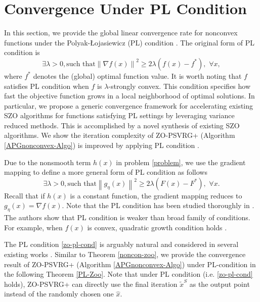 \documentclass{article}
\newcommand{\norm}[1]{\left\lVert#1\right\rVert}
\theoremstyle{definition}
\theoremstyle{remark}
\begin{document}
\section{Convergence Under PL Condition}
{\color{Violet} In this section, we provide the global linear convergence rate for nonconvex functions under the Polyak-Łojasiewicz
(PL) condition \cite{polyak1963gradient}.}
The original form of PL condition is
\begin{equation}
\exists \lambda >0, \text{such~that} \norm{\nabla f(x)}^2 \geq 2\lambda (f(x) - f^*),\,\, \forall x,
\end{equation}
where $f^*$ denotes the (global) optimal function value. It is worth noting that $f$ satisfies PL condition when $f$ is $\lambda$-strongly convex.
{\color{RubineRed}
This condition specifies how fast the objective function grows in a local neighborhood of optimal solutions.
}
{\color{RubineRed}
In particular, we propose a generic convergence framework for accelerating existing SZO algorithms for functions satisfying PL settings by leveraging variance reduced methods. This
is accomplished by a novel synthesis of existing SZO algorithms.
}{\color{Brown} We show the iteration complexity of ZO-PSVRG+ (Algorithm \ref{APGnonconvex-Algo}) is improved by applying PL condition .}



Due to the nonsmooth term $h(x)$ in problem \eqref{problem}, we use the gradient mapping to define a more general form of PL condition as follows
\begin{equation}\label{zo-pl-cond}
\exists \lambda >0, \text{such~that} \norm{g_{\eta}(x)}^2 \geq 2\lambda (F(x) - F^*),\,\, \forall x.
\end{equation}
Recall that if $h(x)$ is a constant function, the gradient mapping reduces to $g_{\eta}(x) = \nabla f(x)$.
{\color{RubineRed}
Note that the PL condition has been studied thoroughly in \cite{karimi2016linear}. The authors show that PL condition is weaker than broad family of  conditions. For example, when $f(x)$ is convex,  quadratic growth condition holds \cite{luo1993error,anitescu2000degenerate}. 
}

The PL condition \eqref{zo-pl-cond} is arguably natural and considered in several existing works \cite{li2018simple}.
{\color{Violet}
Similar to Theorem \ref{noncon-zoo}, we provide the convergence result of ZO-PSVRG+ (Algorithm \ref{APGnonconvex-Algo}) under PL-condition in the
following Theorem \ref{PL-Zoo}. Note that under PL condition (i.e. \eqref{zo-pl-cond} holds), ZO-PSVRG+ can directly use the final iteration $\tilde{x}^S$
as the output point instead of the randomly chosen
one $\hat{x}$. 
}
\end{document}
